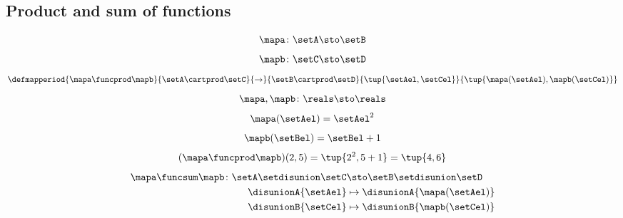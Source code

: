 {\begin{forslides}
    \subsection{Product and sum of functions}

    \begin{equation}
        \label{eq:slides_session2_169}
        \mapa\colon \setA \sto \setB
    \end{equation}
    \begin{equation}
        \label{eq:slides_session2_170}
        \mapb\colon \setC \sto \setD
    \end{equation}
    \begin{equation}
        \label{eq:slides_session2_171}
        \defmapperiod{
            \mapa \funcprod \mapb
        }{
            \setA \cartprod \setC
        }{
            \to
        }{
            \setB\cartprod \setD
        }{
            \tup{\setAel, \setCel}
        }{
            \tup{\mapa(\setAel),\mapb(\setCel)}
        }
    \end{equation}
    \begin{equation}
        \label{eq:slides_session2_172}
        \mapa,\mapb\colon \reals \sto \reals
    \end{equation}
    \begin{equation}
        \label{eq:slides_session2_173}
        \mapa(\setAel)=\setAel^2
    \end{equation}
    \begin{equation}
        \label{eq:slides_session2_174}
        \mapb(\setBel)=\setBel+1
    \end{equation}
    \begin{equation}
        \label{eq:slides_session2_175}
        (\mapa \funcprod \mapb)(2,5)=\tup{2^2,5+1}=\tup{4,6}
    \end{equation}
    \begin{equation}
        \label{eq:slides_session2_176}
        \begin{aligned}
            \mapa \funcsum \mapb \colon \setA \setdisunion \setC & \sto \setB\setdisunion \setD \\
            \disunionA{\setAel}                                  & \mapsto \disunionA{\mapa(\setAel)} \\
            \disunionB{\setCel}                                  & \mapsto \disunionB{\mapb(\setCel)} \\
        \end{aligned}
    \end{equation}

\end{forslides}}
